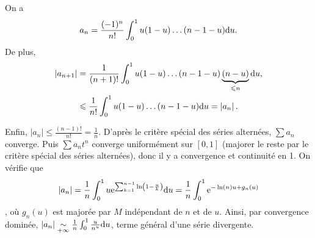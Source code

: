 \documentclass[12pt]{article}
\begin{document}
\begin{remark}
    On a 
    \begin{equation}
        a_n=\frac{(-1)^{n}}{n!}\int_{0}^{1}u(1-u)\dots(n-1-u)\mathrm{d} u.
    \end{equation}
    De plus,
    \begin{align}
        \left\lvert a_{n+1}\right\rvert
        &=\frac{1}{(n+1)!}\int_{0}^{1}u(1-u)\dots(n-1-u)\underbrace{(n-u)}_{\leqslant n}\mathrm{d} u,\\
        &\leqslant \frac{1}{n!}\int_{0}^{1}u(1-u)\dots(n-1-u)\mathrm{d} u=\left\lvert a_n\right\rvert.
    \end{align}

    Enfin, $\left\lvert a_n\right\rvert\leqslant\frac{(n-1)!}{n!}=\frac{1}{n}$. D'après le critère spécial des séries alternées, $\sum a_{n}$ converge. Puis $\sum a_{n}t^{n}$ converge uniformément sur $[0,1]$ (majorer le reste par le critère spécial des séries alternées), donc il y a convergence et continuité en 1. On vérifie que
    \begin{equation*}
        \left\lvert a_n\right\rvert=\frac{1}{n}\int_{0}^{1}u\mathrm{e}^{\sum_{k=1}^{n-1}\ln\left(1-\frac{u}{k}\right)}\mathrm{d} u=\frac{1}{n}\int_{0}^{1}\mathrm{e}^{-\ln(n)u+g_n(u)}
    \end{equation*}, où $g_n(u)$ est majorée par $M$ indépendant de $n$ et de $u$. Ainsi, par convergence dominée, $\left\lvert a_n\right\rvert\underset{+\infty}{\sim}\frac{1}{n}\int_{0}^{1}\frac{u}{n^{u}}\mathrm{d} u$, terme général d'une série divergente.
\end{remark}
\end{document}
